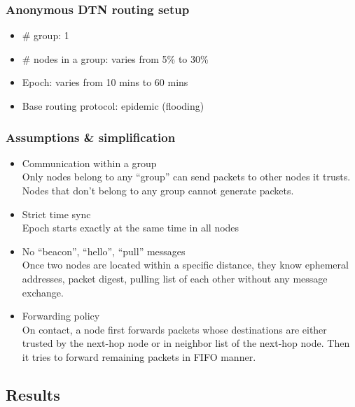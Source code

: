 \documentclass[11pt]{article}
\begin{document}
\subsubsection{Anonymous DTN routing setup}
\begin{itemize}
 \item \# group: 1
 \item \# nodes in a group: varies from 5\% to 30\%
 \item Epoch: varies from 10 mins to 60 mins
 \item Base routing protocol: epidemic (flooding)
\end{itemize}



\subsubsection{Assumptions \& simplification}
\begin{itemize}
 \item Communication within a group\\
Only nodes belong to any ``group'' can send packets to other nodes it trusts. 
Nodes that don't belong to any group cannot generate packets.

 \item Strict time sync\\
Epoch starts exactly at the same time in all nodes

 \item No ``beacon'', ``hello'', ``pull'' messages\\
Once two nodes are located within a specific distance, they know ephemeral addresses, packet digest, pulling list of each other without any message exchange. 

 \item Forwarding policy\\
On contact, a node first forwards packets whose destinations are either trusted by the next-hop node or in neighbor list of the next-hop node.  Then it tries to forward remaining packets in FIFO manner. 
\end{itemize}


\subsection{Results}
\end{document}
